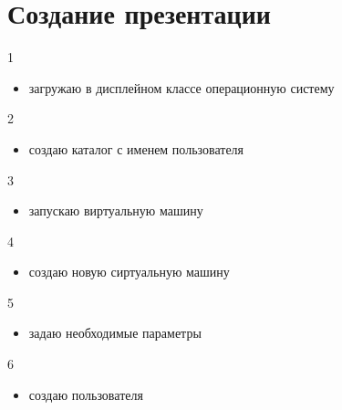 \documentclass[
  ignorenonframetext,
  aspectratio=169,
]{beamer}
\providecommand{\tightlist}{%
  \setlength{\itemsep}{0pt}\setlength{\parskip}{0pt}}\usepackage{longtable,booktabs,array}
\begin{document}
\section{Создание
презентации}\label{ux441ux43eux437ux434ux430ux43dux438ux435-ux43fux440ux435ux437ux435ux43dux442ux430ux446ux438ux438}

\begin{frame}{1}
\label{section}
\begin{itemize}[<+->]
\tightlist
\item
  загружаю в дисплейном классе операционную систему
\end{itemize}
\end{frame}

\begin{frame}{2}
\label{section-1}
\begin{itemize}[<+->]
\tightlist
\item
  создаю каталог с именем пользователя
\end{itemize}
\end{frame}

\begin{frame}{3}
\label{section-2}
\begin{itemize}[<+->]
\tightlist
\item
  запускаю виртуальную машину
\end{itemize}
\end{frame}

\begin{frame}{4}
\label{section-3}
\begin{itemize}[<+->]
\tightlist
\item
  создаю новую сиртуальную машину
\end{itemize}
\end{frame}

\begin{frame}{5}
\label{section-4}
\begin{itemize}[<+->]
\tightlist
\item
  задаю необходимые параметры
\end{itemize}
\end{frame}

\begin{frame}{6}
\label{section-5}
\begin{itemize}[<+->]
\tightlist
\item
  создаю пользователя
\end{itemize}
\end{frame}
\end{document}
